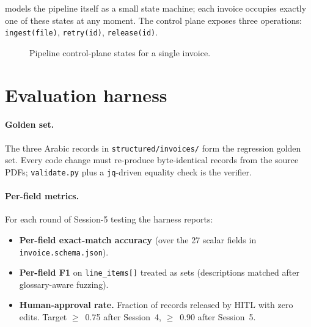  models the pipeline itself as a small state
machine; each invoice occupies exactly one of these states at any
moment. The control plane exposes three operations:
\texttt{ingest(file)}, \texttt{retry(id)}, \texttt{release(id)}.

\begin{figure}[htbp]
\centering
{}
\caption{Pipeline control-plane states for a single invoice.}
\label{fig:pipeline-states}
\end{figure}

\section{Evaluation harness}

\paragraph{Golden set.} The three Arabic records in
\corpus\texttt{structured/invoices/} form the regression golden set.
Every code change must re-produce byte-identical records from the
source PDFs; \texttt{validate.py} plus a \texttt{jq}-driven equality
check is the verifier.

\paragraph{Per-field metrics.} For each round of Session-5 testing the
harness reports:

\begin{itemize}
  \item \textbf{Per-field exact-match accuracy} (over the 27 scalar
        fields in \texttt{invoice.schema.json}).
  \item \textbf{Per-field F1} on \texttt{line\_items[]} treated as sets
        (descriptions matched after glossary-aware fuzzing).
  \item \textbf{Human-approval rate.} Fraction of records released by
        HITL with zero edits. Target $\geq$~0.75 after Session~4,
        $\geq$~0.90 after Session~5.
\end{itemize}

